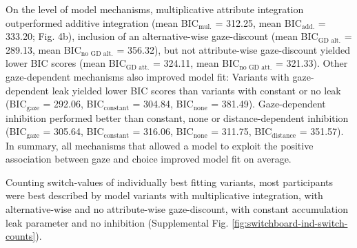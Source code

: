 \documentclass[11pt, a4paper]{article}
\begin{document}
On the level of model mechanisms, multiplicative attribute integration outperformed additive integration (mean BIC$_{\text{mul.}}$ = 312.25, mean BIC$_{\text{add.}}$ = 333.20; Fig. 4b), inclusion of an alternative-wise gaze-discount (mean BIC$_{\text{GD alt.}}$ = 289.13, mean BIC$_{\text{no GD alt.}}$  = 356.32), but not attribute-wise gaze-discount yielded lower BIC scores (mean BIC$_{\text{GD att.}}$  = 324.11, mean BIC$_{\text{no GD att.}}$ = 321.33). Other gaze-dependent mechanisms also improved model fit: Variants with gaze-dependent leak yielded lower BIC scores than variants with constant or no leak (BIC$_{\text{gaze}}$  = 292.06, BIC$_{\text{constant}}$ = 304.84, BIC$_{\text{none}}$ = 381.49). Gaze-dependent inhibition performed better than constant, none or distance-dependent inhibition (BIC$_{\text{gaze}}$ = 305.64, BIC$_{\text{constant}}$ = 316.06, BIC$_{\text{none}}$ = 311.75, BIC$_{\text{distance}}$ = 351.57). In summary, all mechanisms that allowed a model to exploit the positive association between gaze and choice improved model fit on average.

Counting switch-values of individually best fitting variants, most participants were best described by model variants with multiplicative integration, with alternative-wise and no attribute-wise gaze-discount, with constant accumulation leak parameter and no inhibition (Supplemental Fig. \ref{fig:switchboard-ind-switch-counts}).
\end{document}
